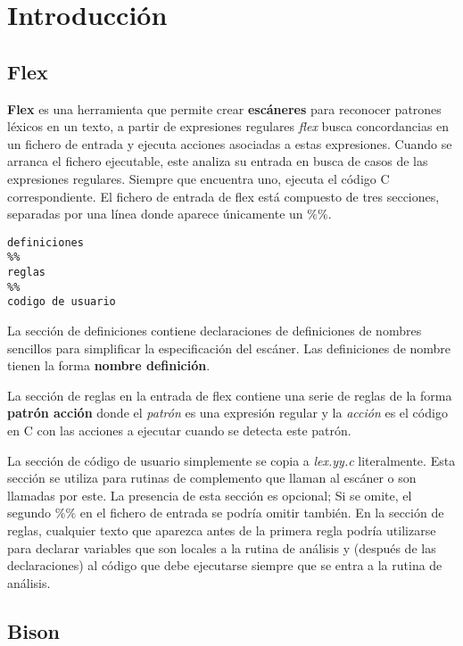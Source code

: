 \section{Introducción}

\subsection{Flex}

\textbf{Flex} es una herramienta que permite crear \textbf{escáneres} para reconocer patrones léxicos en un texto, a partir de expresiones regulares \textit{flex} busca concordancias en un fichero de entrada y ejecuta acciones asociadas a estas expresiones. Cuando se arranca el fichero ejecutable, este analiza su entrada en busca de casos de las expresiones regulares. Siempre que encuentra uno, ejecuta el código C correspondiente. El fichero de entrada de flex está compuesto de tres secciones, separadas por una línea donde aparece únicamente un $\%\%$.

\begin{lstlisting}
definiciones
%%
reglas
%%
codigo de usuario
\end{lstlisting}

La sección de definiciones contiene declaraciones de definiciones de nombres sencillos para simplificar la especificación del escáner. Las definiciones de nombre tienen la forma \textbf{nombre definición}.

La sección de reglas en la entrada de flex contiene una serie de reglas de la forma \textbf{patrón acción} donde el \textit{patrón} es una expresión regular y la \textit{acción} es el código en C con las acciones a ejecutar cuando se detecta este patrón.

La sección de código de usuario simplemente se copia a \textit{lex.yy.c} literalmente. Esta sección se utiliza para rutinas de complemento que llaman al escáner o son llamadas por este. La presencia de esta sección es opcional; Si se omite, el segundo $\%\%$ en el fichero de entrada se podría omitir también. En la sección de reglas, cualquier texto que aparezca antes de la primera regla podría utilizarse para declarar variables que son locales a la rutina de análisis y (después de las declaraciones) al código que debe ejecutarse siempre que se entra a la rutina de análisis.

\subsection{Bison}


